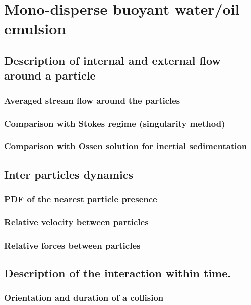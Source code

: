 \documentclass[12pt,a4paper,openany]{My_book}
\newcommand{\tb}[1]{\color{blue}#1\color{black}}
\begin{document}
% 
% 

% 
% 
\tb{
\chapter{Mono-disperse buoyant water/oil emulsion}

\section{Description of internal and external flow around a particle}
\subsection{Averaged stream flow around the particles}
\subsection{Comparison with Stokes regime (singularity method)}    
\subsection{Comparison with Ossen solution for inertial sedimentation}    


\section{Inter particles dynamics}
\subsection{PDF of the nearest particle presence}
\subsection{Relative velocity between particles}
\subsection{Relative forces between particles}

\section{Description of the interaction within time.}
\subsection{Orientation and duration of a collision}
}
\end{document}
